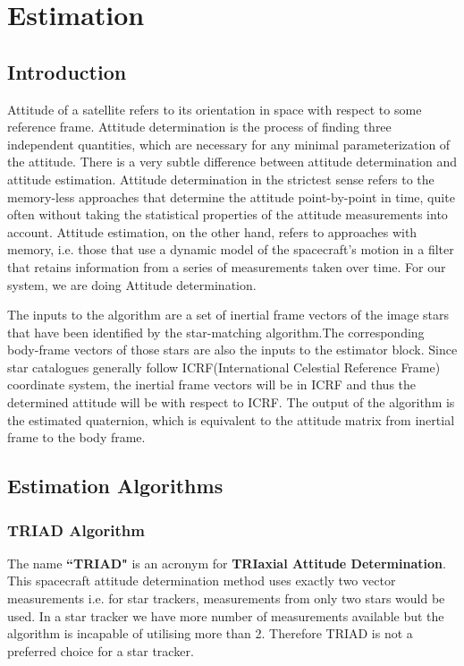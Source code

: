 \section{Estimation}
{

\subsection{Introduction}
{
Attitude of a satellite refers to its orientation in space with respect to some reference frame. Attitude determination is the process of finding three independent quantities, which are necessary for any minimal parameterization of the attitude. There is a very subtle difference between attitude determination and attitude estimation. Attitude determination in the strictest sense refers to the memory-less approaches that determine the attitude point-by-point in time, quite often without taking the statistical properties of the attitude measurements into account. Attitude estimation, on the other hand, refers to approaches with memory, i.e. those that use a dynamic model of the spacecraft’s motion in a filter that retains information from a series of measurements taken over time. For our system, we are doing Attitude determination.

The inputs to the algorithm are a set of inertial frame vectors of the image stars that have been identified by the star-matching algorithm.The corresponding body-frame vectors of those stars are also the inputs to the estimator block. Since star catalogues generally follow ICRF(International Celestial Reference Frame) coordinate system, the inertial frame vectors will be in ICRF and thus the determined attitude will be with respect to ICRF. The output of the algorithm is the estimated quaternion, which is equivalent to the attitude matrix from inertial frame to the body frame.
}

\subsection{Estimation Algorithms}  
{

\subsubsection{TRIAD Algorithm}
{
The name \textbf{``TRIAD"} is an acronym for \textbf{TRIaxial Attitude Determination}. This spacecraft attitude determination method uses exactly two vector measurements i.e. for star trackers, measurements from only two stars would be used. In a star tracker we have more number of measurements available but the algorithm is incapable of utilising more than 2. Therefore TRIAD is not a preferred choice for a star tracker.
}


}}
